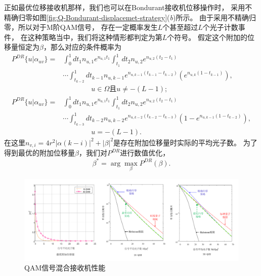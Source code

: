 正如最优位移接收机那样，我们也可以在Bondurant接收机位移操作时，
采用不精确归零如图\ref{fig:Q-Bondurant-displacemet-strategy}(\textit{b})所示。
由于采用不精确归零，所以对于M阶QAM信号，
存在一定概率发生$L$个甚至超过$L$个光子计数事件，
在这种策略当中，我们将这种情形都判定为第$L$个符号。
假定这个附加的位移量恒定为$\beta$，那么对应的条件概率为
\begin{equation}
\begin{split}
P^{DR}\{u|\alpha_{uv}\} = & \int_0^1 dt_1 n_{u,1} e^{n_{u,1} t_1} \int_{t_1}^1 dt_2 n_{u,2} e^{n_{u,2} (t_2-t_1)} \\
                          & \cdots \int_{t_{k-2}}^1 dt_{k-1} n_{u,k-1} e^{n_{u,k-1} (t_{k-1}-t_{k-2})} \left( e^{n_{u,k} (1-t_{k-1})}\right), \\
                          & \qquad \qquad u \in \Omega \text{且} u \neq -(L-1);   \\
P^{DR}\{u|\alpha_{uv}\} = & \int_0^1 dt_1 n_{u,1} e^{n_{u,1} t_1} \int_{t_1}^1 dt_2 n_{u,2} e^{n_{u,2} (t_2-t_1)} \\
                          & \cdots \int_{t_{k-3}}^1 dt_{k-2} n_{u,k-2} e^{n_{u,k-2} (t_{k-2}-t_{k-3})} \left( 1 - e^{n_{u,k-1} (1-t_{k-2})}\right),  \\
                          & \qquad \qquad u = -(L-1).
\end{split}
\label{eq:DR-cond-p-2}
\end{equation}
在这里$n_{v,i} = 4r^2|\alpha(k-i)|^2 + |\beta|^2$是存在附加位移量时实际的平均光子数。
为了得到最优的附加位移量$\beta$，我们对$P^{DR}$进行数值优化，
\begin{equation}
\beta^* = \arg\max_{\beta} P^{DR}(\beta).
\end{equation}

\begin{figure}
\centering
  \includegraphics[width=\textwidth]{figures/chap3/QAM-Hybrid-error}
  \caption{QAM信号混合接收机性能}
  \label{fig:QAM-Hybrid-error}
\end{figure}


